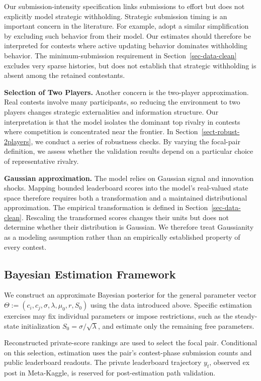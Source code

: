 \documentclass[mnsc]{informs3}
\begin{document}
Our submission-intensity specification links submissions to effort but does not explicitly model strategic withholding.
Strategic submission timing is an important concern in the literature.
For example, \citet{lemus2021dynamic} adopt a similar simplification by excluding such behavior from their model.
Our estimates should therefore be interpreted for contests where active updating behavior dominates withholding behavior.
{The minimum-submission requirement in Section~\ref{sec-data-clean} excludes very sparse histories, but does not establish that strategic withholding is absent among the retained contestants.}


\textbf{Selection of Two Players.}
Another concern is the two-player approximation.
Real contests involve many participants, so reducing the environment to two players changes strategic externalities and information structure.
Our interpretation is that the model isolates the dominant top rivalry in contests where competition is concentrated near the frontier.
In Section~\ref{sect-robust-2players}, we conduct a series of robustness checks.
By varying the focal-pair definition, we assess whether the validation results depend on a particular choice of representative rivalry.

\textbf{Gaussian approximation.}
The model relies on Gaussian signal and innovation shocks. Mapping bounded leaderboard scores into the model's real-valued state space therefore requires both a transformation and a maintained distributional approximation. The empirical transformation is defined in Section~\ref{sec-data-clean}. Rescaling the transformed scores changes their units but does not determine whether their distribution is Gaussian. We therefore treat Gaussianity as a modeling assumption rather than an empirically established property of every contest.



\subsection{Bayesian Estimation Framework}

{We construct an approximate Bayesian posterior for the general parameter vector $\Theta:=(c_i,c_j,\sigma,\lambda,\mu_0,r,S_0)$ using the data introduced above. Specific estimation exercises may fix individual parameters or impose restrictions, such as the steady-state initialization $S_0=\sigma/\sqrt\lambda$, and estimate only the remaining free parameters.}

{Reconstructed private-score rankings are used to select the focal pair. Conditional on this selection, estimation uses the pair's contest-phase submission counts and public leaderboard readouts. The private leaderboard trajectory $y_t$, observed ex post in Meta-Kaggle, is reserved for post-estimation path validation.}
\end{document}
